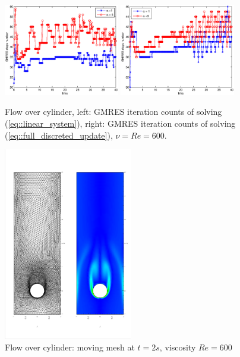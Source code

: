 \documentclass{eajam}
\begin{document}
      \begin{figure}[!htbp]
        \begin{center}
          \includegraphics[width = 0.45\textwidth]{picture/obstacle_flow_data/NS_iterate_steps.eps}
          \includegraphics[width = 0.45\textwidth]{picture/obstacle_flow_data/moving_iterate_steps.eps}
        \end{center}
        \caption{\small Flow over cylinder, left: GMRES iteration counts of
          solving (\ref{eq::linear_system}), right: GMRES iteration
          counts of solving (\ref{eq::full_discreted_update}), $\nu =
          Re = 600$.}
        \label{fig::cylinder_GMRES_steps}
      \end{figure}
      
      
      \begin{figure}[!htbp]
        \centering
        \includegraphics[width = 0.5\textwidth, angle = -90]{picture/obstacle_flow_data/mesh_vortex_t2s.eps}
        \caption{\small Flow over cylinder: moving mesh at $t = 2s$,
          viscosity $Re = 600$}
        \label{fig::cylinder_mesh_2s}
      \end{figure}
\end{document}
